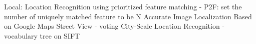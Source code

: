 Local:
Location Recognition using prioritized feature matching
- P2F: set the number of uniquely matched feature to be N
Accurate Image Localization Based on Google Maps Street View
- voting
City-Scale Location Recognition
- vocabulary tree on SIFT





